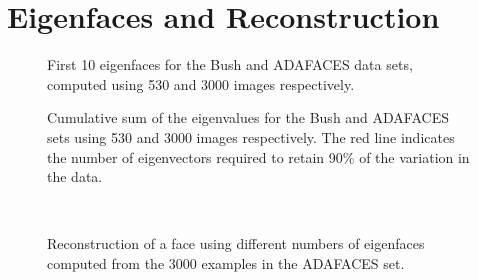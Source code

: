 \documentclass[10pt,a4paper]{article}
\begin{document}
\section{Eigenfaces and Reconstruction}
\begin{figure}
  \centering
  \caption{First 10 eigenfaces for the Bush and ADAFACES data sets, computed
    using 530 and 3000 images respectively.}
  \label{fig:eigf}
\end{figure}

\begin{figure}
  \centering
    \caption{Cumulative sum of the eigenvalues for the Bush and ADAFACES sets
      using 530 and 3000 images respectively. The red line indicates the number
      of eigenvectors required to retain 90\% of the variation in the data.}
  \label{fig:csum}
\end{figure}

\begin{figure}
  \centering
  \\
  \caption{Reconstruction of a face using different numbers of eigenfaces
    computed from the 3000 examples in the ADAFACES set.}
  \label{fig:rec}
\end{figure}
\end{document}
